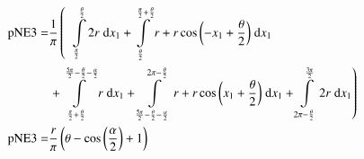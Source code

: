 \begin{align}
    \mathrm{pNE3} =&\frac{1}{\pi} \left(\;\;\int\limits_{\frac{\pi}{2}}^{\frac{\theta}{2}}2 r\;\mathrm{d}x_{1}+\int\limits_{\frac{\theta}{2}}^{\frac{\pi}{2} + \frac{\theta}{2}}r + r \cos{\left (- x_{1} + \frac{\theta}{2} \right )}\;\mathrm{d}x_{1}\right.\notag\\
 &\left.+\int\limits_{\frac{\pi}{2} + \frac{\theta}{2}}^{\frac{5 \pi}{2} - \frac{\theta}{2} - \frac{\alpha}{2}}r\;\mathrm{d}x_{1}+\int\limits_{\frac{5 \pi}{2} - \frac{\theta}{2} - \frac{\alpha}{2}}^{2 \pi - \frac{\theta}{2}}r + r \cos{\left (x_{1} + \frac{\theta}{2} \right )}\;\mathrm{d}x_{1}+\int\limits_{2 \pi - \frac{\theta}{2}}^{\frac{3 \pi}{2}}2 r\;\mathrm{d}x_{1}\right)\label{pNE3Def}\\
    \mathrm{pNE3} =& \frac{r}{\pi} \left(\theta - \cos{\left (\frac{\alpha}{2} \right )} + 1\right)\label{pNE3Sln}
\end{align}